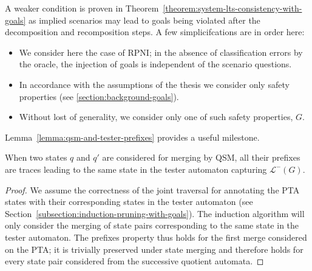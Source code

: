 A weaker condition is proven in Theorem~\ref{theorem:system-lts-consistency-with-goals} as implied scenarios may lead to goals being violated after the decomposition and recomposition steps. A few simplicifcations are in order here:
\begin{itemize}
\item We consider here the case of RPNI; in the absence of classification errors by the oracle, the injection of goals is independent of the scenario questions. 
\item In accordance with the assumptions of the thesis we consider only safety properties (see \ref{section:background-goals}).
\item Without lost of generality, we consider only one of such safety properties, $G$. 
\end{itemize}

Lemma~\ref{lemma:qsm-and-tester-prefixes} provides a useful milestone.

\begin{lemma}
When two states $q$ and $q'$ are considered for merging by QSM, all their prefixes are traces leading to the same state in the tester automaton capturing $\mathcal{L}^-(G)$.\label{lemma:qsm-and-tester-prefixes}
\begin{proof}
We assume the correctness of the joint traversal for annotating the PTA states with their corresponding states in the tester automaton (see Section~\ref{subsection:induction-pruning-with-goals}). The induction algorithm will only consider the merging of state pairs corresponding to the same state in the tester automaton. The prefixes property thus holds for the first merge considered on the PTA; it is trivially preserved under state merging and therefore holds for every state pair considered from the successive quotient automata.
\end{proof}
\end{lemma}

